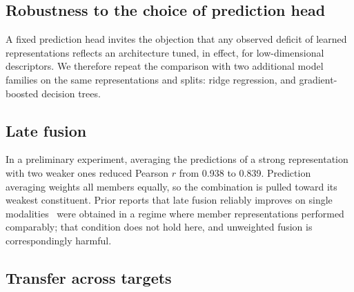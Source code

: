 \subsection{Robustness to the choice of prediction head}
\label{sec:results-robust}

A fixed prediction head invites the objection that any observed deficit of
learned representations reflects an architecture tuned, in effect, for
low-dimensional descriptors. We therefore repeat the comparison with two
additional model families on the same representations and splits: ridge
regression, and gradient-boosted decision trees.


\subsection{Late fusion}
\label{sec:results-fusion}


In a preliminary experiment, averaging the predictions of a strong
representation with two weaker ones reduced Pearson $r$ from \num{0.938} to
\num{0.839}. Prediction averaging weights all members equally, so the
combination is pulled toward its weakest constituent. Prior reports that late
fusion reliably improves on single
modalities~\citep{martinezgalindo2026multimodality} were obtained in a regime
where member representations performed comparably; that condition does not hold
here, and unweighted fusion is correspondingly harmful.


\subsection{Transfer across targets}


